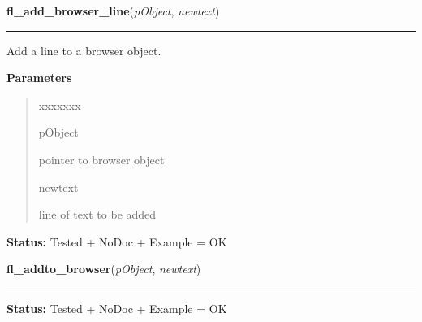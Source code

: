 \hspace{.8\funcindent}\begin{boxedminipage}{\funcwidth}

    \raggedright \textbf{fl\_add\_browser\_line}(\textit{pObject}, \textit{newtext})

    \vspace{-1.5ex}

    \rule{\textwidth}{0.5\fboxrule}
\setlength{\parskip}{2ex}
    Add a line to a browser object.

\setlength{\parskip}{1ex}
      \textbf{Parameters}
      \vspace{-1ex}

      \begin{quote}
        \begin{Ventry}{xxxxxxx}

          \item[pObject]

          pointer to browser object

          \item[newtext]

          line of text to be added

        \end{Ventry}

      \end{quote}

\textbf{Status:} Tested + NoDoc + Example = OK



    \end{boxedminipage}

    \label{xformslib:library:fl_addto_browser}

    \vspace{0.5ex}

\hspace{.8\funcindent}\begin{boxedminipage}{\funcwidth}

    \raggedright \textbf{fl\_addto\_browser}(\textit{pObject}, \textit{newtext})

    \vspace{-1.5ex}

    \rule{\textwidth}{0.5\fboxrule}
\setlength{\parskip}{2ex}
\setlength{\parskip}{1ex}
\textbf{Status:} Tested + NoDoc + Example = OK



    \end{boxedminipage}

